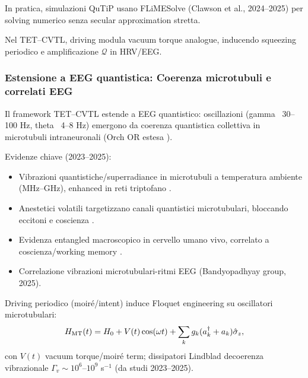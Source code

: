 \documentclass[11pt,a4paper]{article}
\let\oldcite\cite
\renewcommand{\cite}{\protect\oldcite}
\theoremstyle{plain}
\theoremstyle{definition}
\begin{document}
\vspace{0.2cm}

In pratica, simulazioni QuTiP usano FLiMESolve (Clawson et al., 2024--2025) per solving numerico senza secular approximation stretta.

\vspace{0.3cm}

Nel TET--CVTL, driving modula vacuum torque analogue, inducendo squeezing periodico e amplificazione $\mathcal{Q}$ in HRV/EEG.



\subsubsection{Estensione a EEG quantistica: Coerenza microtubuli e correlati EEG}

Il framework TET--CVTL estende a EEG quantistico: oscillazioni (gamma ~30--100 Hz, theta ~4--8 Hz) emergono da coerenza quantistica collettiva in microtubuli intraneuronali (Orch OR estesa \cite{Hameroff2021, Wiest2025niaf011}).

\vspace{0.3cm}

Evidenze chiave (2023--2025):

\vspace{0.2cm}
\begin{itemize}
    \item Vibrazioni quantistiche/superradiance in microtubuli a temperatura ambiente (MHz--GHz), enhanced in reti triptofano \cite{Kalra2023}.

    \vspace{0.2cm}
    \item Anestetici volatili targetizzano canali quantistici microtubulari, bloccando eccitoni e coscienza \cite{Wiest2025niaf011}.

    
\vspace{0.2cm}

    \item Evidenza entangled macroscopico in cervello umano vivo, correlato a coscienza/working memory \cite{Wiest2025niaf011}.

    \vspace{0.2cm}
    \item Correlazione vibrazioni microtubulari-ritmi EEG (Bandyopadhyay group, 2025).
\end{itemize}

\vspace{0.3cm}

Driving periodico (moiré/intent) induce Floquet engineering su oscillatori microtubulari:
\begin{equation}
    H_{\rm MT}(t) = H_0 + V(t) \cos(\omega t) + \sum_k g_k (a_k^\dagger + a_k) \hat{\sigma}_z,
    \label{eq:H_MT}
\end{equation}
con $V(t)$ vacuum torque/moiré term; dissipatori Lindblad decoerenza vibrazionale $\Gamma_v \sim 10^6$--$10^9$ s$^{-1}$ (da studi 2023--2025).
\end{document}
